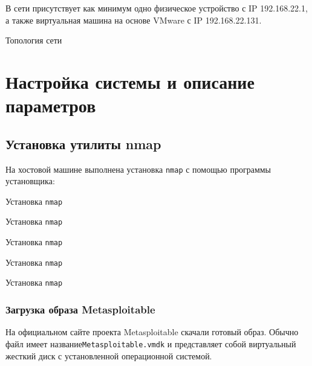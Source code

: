 В сети присутствует как минимум одно физическое устройство с IP 192.168.22.1,
а также виртуальная машина на основе VMware с IP 192.168.22.131.

\begin{image}
    \caption{Топология сети}
    \label{fig:topology}
\end{image}



\section{Настройка системы и описание параметров}

\subsection{Установка утилиты nmap}

На хостовой машине выполнена установка \texttt{nmap}
с помощью программы установщика:

\begin{image}
	\caption{Установка \texttt{nmap}}
	\label{fig:install:1}
\end{image}


\begin{image}
	\caption{Установка \texttt{nmap}}
	\label{fig:install:2}
\end{image}

\begin{image}
	\caption{Установка \texttt{nmap}}
	\label{fig:install:3}
\end{image}


\begin{image}
	\caption{Установка \texttt{nmap}}
	\label{fig:install:4}
\end{image}

\begin{image}
	\caption{Установка \texttt{nmap}}
	\label{fig:install:5}
\end{image}



\subsubsection{Загрузка образа Metasploitable}

На официальном сайте проекта Metasploitable скачали готовый образ.
Обычно файл имеет название\texttt{Metasploitable.vmdk} 
и представляет собой виртуальный жесткий диск
с установленной операционной системой.

